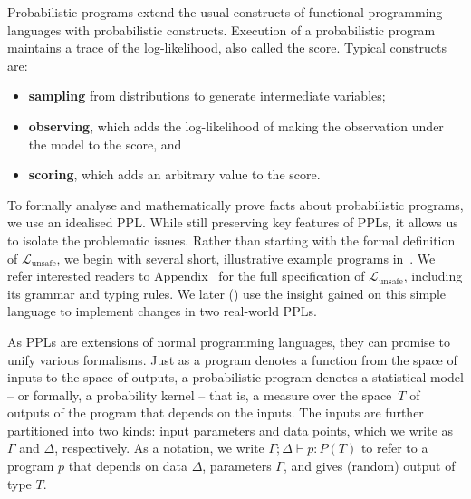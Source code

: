\documentclass[preprint]{uai2026} %
\newcommand{\Lunsafe}{\mathcal{L}_{\text{unsafe}}}
\begin{document}
Probabilistic programs extend the usual constructs of functional programming languages with probabilistic constructs. Execution of a probabilistic program maintains a trace of the log-likelihood, also called the score. Typical constructs are:
\begin{itemize}[left=0pt,nosep]
    \item \textbf{sampling} from distributions to generate intermediate variables;
    \item \textbf{observing}, which adds the log-likelihood of making the observation under the model to the score, and
    \item \textbf{scoring}, which adds an arbitrary value to the score.
\end{itemize}
To formally analyse and mathematically prove facts about probabilistic programs, we use an idealised PPL. While still preserving key features of PPLs, it allows us to isolate the problematic issues. 
Rather than starting with the formal definition of $\Lunsafe$, we begin with several short, illustrative example programs in~. We refer interested readers to Appendix~ for the full specification of $\Lunsafe$, including its grammar and typing rules. We later () use the insight gained on this simple language to implement changes in two real-world PPLs. 


As PPLs are extensions of normal programming languages, they can promise to unify various formalisms. Just as a program denotes a function from the space of inputs to the space of outputs, a probabilistic program denotes a statistical model -- or formally, a probability kernel -- that is, a measure over the space~$T$ of outputs of the program that depends on the inputs. The inputs are further partitioned into two kinds: input parameters and data points, which we write as $\Gamma$ and $\Delta$, respectively. As a notation, we write $\Gamma;\Delta \vdash p: P(T)$ to refer to a program $p$ that depends on data $\Delta$, parameters $\Gamma$, and gives (random) output of type $T$.
\end{document}
